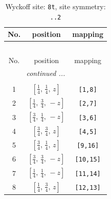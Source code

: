 \documentclass[fleqn,8pt]{jsarticle}
\begin{document}
\begin{longtable}{ccc}
\caption{Wyckoff site: {\tt 8t}, site symmetry: {\tt ..2}}
 \\
 \hline \hline
No. & position & mapping \\ \hline \endfirsthead

\multicolumn{2}{l}{\tablename\ \thetable{}} \\
 \hline \hline
No. & position & mapping \\ \hline \endhead

 \hline \hline
\multicolumn{2}{r}{\footnotesize\it continued ...} \\ \endfoot

 \hline \hline
\multicolumn{2}{r}{} \\ \endlastfoot

1 & $\left[ \frac{1}{4},\, \frac{1}{4},\, z \right]$ & {\tt [1,8]} \\ \hline
2 & $\left[ \frac{1}{4},\, \frac{3}{4},\, - z \right]$ & {\tt [2,7]} \\ \hline
3 & $\left[ \frac{3}{4},\, \frac{1}{4},\, - z \right]$ & {\tt [3,6]} \\ \hline
4 & $\left[ \frac{3}{4},\, \frac{3}{4},\, z \right]$ & {\tt [4,5]} \\ \hline
5 & $\left[ \frac{3}{4},\, \frac{1}{4},\, z \right]$ & {\tt [9,16]} \\ \hline
6 & $\left[ \frac{3}{4},\, \frac{3}{4},\, - z \right]$ & {\tt [10,15]} \\ \hline
7 & $\left[ \frac{1}{4},\, \frac{1}{4},\, - z \right]$ & {\tt [11,14]} \\ \hline
8 & $\left[ \frac{1}{4},\, \frac{3}{4},\, z \right]$ & {\tt [12,13]} \\
\end{longtable}
\renewcommand{\arraystretch}{1.2}
\end{document}

